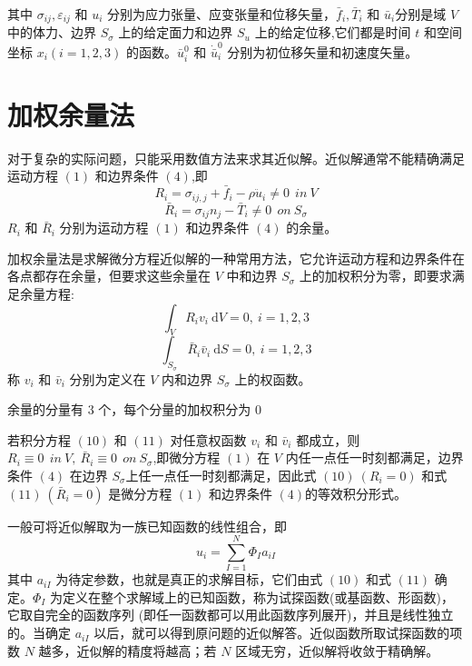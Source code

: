 \documentclass[12pt,a4paper]{article}
\begin{document}
其中 $\sigma_{ij},\varepsilon_{ij}$ 和 $u_i$ 分别为应力张量、应变张量和位移矢量，$\bar{f}_i,\bar{T}_i$ 和 $\bar{u}_i$分别是域 $V$ 中的体力、边界 $S_{\sigma}$ 上的给定面力和边界 $S_u$ 上的给定位移,它们都是时间 $t$ 和空间坐标 $x_i (i = 1, 2, 3)$ 的函数。$\bar{u}^0_i$ 和 $\dot{\bar{u}}^0_i$ 分别为初位移矢量和初速度矢量。

\section{加权余量法}
对于复杂的实际问题，只能采用数值方法来求其近似解。近似解通常不能精确满足运动方程 $(1)$ 和边界条件 $(4)$,即
\begin{equation}
R_i=\sigma_{ij,j}+\bar{f}_i-\rho\ddot{u}_i\ne 0 ~~in~V
\end{equation}
\begin{equation}
\bar{R}_i=\sigma_{ij}n_j-\bar{T}_i\ne 0 ~~on~S_{\sigma}
\end{equation}
$R_i$ 和 $\bar{R}_i$ 分别为运动方程 $(1)$ 和边界条件 $(4)$ 的余量。

加权余量法是求解微分方程近似解的一种常用方法，它允许运动方程和边界条件在各点都存在余量，但要求这些余量在 $V$ 中和边界 $S_{\sigma}$ 上的加权积分为零，即要求满足余量方程:
\begin{equation}
\int_{V} R_iv_i ~ \mathrm{d}V=0 , ~ i=1,2,3
\end{equation}
\begin{equation}
\int_{S_{\sigma}} \bar{R}_i\bar{v}_i ~ \mathrm{d}S=0 , ~ i=1,2,3
\end{equation}
称 $v_i$ 和 $\bar{v}_i$ 分别为定义在 $V$ 内和边界 $S_{\sigma}$ 上的权函数。

余量的分量有 $3$ 个，每个分量的加权积分为 $0$

若积分方程 $(10)$ 和 $(11)$ 对任意权函数 $v_i$ 和 $\bar{v}_i$ 都成立，则 $R_i\equiv 0 ~~in~V,~\bar{R}_i\equiv 0 ~~on~S_{\sigma}$,即微分方程 $(1)$ 在 $V$ 内任一点任一时刻都满足，边界条件 $(4)$ 在边界 $S_{\sigma}$上任一点任一时刻都满足，因此式 $(10) ~ (R_i =0)$ 和式 $(11) ~ (\bar{R}_i =0)$ 是微分方程 $(1)$ 和边界条件 $(4)$的等效积分形式。

一般可将近似解取为一族已知函数的线性组合，即
\begin{equation}
u_i=\sum_{I=1}^N \Phi_I a_{iI}
\end{equation}
其中 $a_{iI}$ 为待定参数，也就是真正的求解目标，它们由式 $(10)$ 和式 $(11)$ 确定。$\Phi_I$ 为定义在整个求解域上的已知函数，称为试探函数(或基函数、形函数)，它取自完全的函数序列 (即任一函数都可以用此函数序列展开)，并且是线性独立的。当确定 $a_{iI}$ 以后，就可以得到原问题的近似解答。近似函数所取试探函数的项数 $N$ 越多，近似解的精度将越高；若 $N$ 区域无穷，近似解将收敛于精确解。
\end{document}
